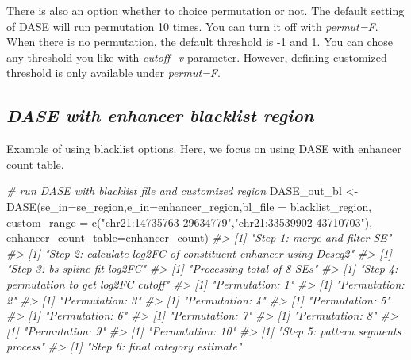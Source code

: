 \documentclass[
]{article}
\newenvironment{Shaded}{\begin{snugshade}}{\end{snugshade}}
\newcommand{\AttributeTok}[1]{\textcolor[rgb]{0.77,0.63,0.00}{#1}}
\newcommand{\CommentTok}[1]{\textcolor[rgb]{0.56,0.35,0.01}{\textit{#1}}}
\newcommand{\FunctionTok}[1]{\textcolor[rgb]{0.00,0.00,0.00}{#1}}
\newcommand{\NormalTok}[1]{#1}
\newcommand{\OtherTok}[1]{\textcolor[rgb]{0.56,0.35,0.01}{#1}}
\newcommand{\StringTok}[1]{\textcolor[rgb]{0.31,0.60,0.02}{#1}}
\begin{document}
There is also an option whether to choice permutation or not. The
default setting of DASE will run permutation 10 times. You can turn it
off with \emph{permut=F}. When there is no permutation, the default
threshold is -1 and 1. You can chose any threshold you like with
\emph{cutoff\_v} parameter. However, defining customized threshold is
only available under \emph{permut=F}.

\hypertarget{dase-with-enhancer-blacklist-region}{%
\subsection{\texorpdfstring{\emph{DASE with enhancer blacklist
region}}{DASE with enhancer blacklist region}}\label{dase-with-enhancer-blacklist-region}}

Example of using blacklist options. Here, we focus on using DASE with
enhancer count table.

\begin{Shaded}
\begin{Highlighting}[]
\CommentTok{\# run DASE with blacklist file and customized region}
\NormalTok{DASE\_out\_bl }\OtherTok{\textless{}{-}} \FunctionTok{DASE}\NormalTok{(}\AttributeTok{se\_in=}\NormalTok{se\_region,}\AttributeTok{e\_in=}\NormalTok{enhancer\_region,}\AttributeTok{bl\_file =}\NormalTok{ blacklist\_region,}
                 \AttributeTok{custom\_range =} \FunctionTok{c}\NormalTok{(}\StringTok{"chr21:14735763{-}29634779"}\NormalTok{,}\StringTok{"chr21:33539902{-}43710703"}\NormalTok{),}
                 \AttributeTok{enhancer\_count\_table=}\NormalTok{enhancer\_count)}
\CommentTok{\#\textgreater{} [1] "Step 1: merge and filter SE"}
\CommentTok{\#\textgreater{} [1] "Step 2: calculate log2FC of constituent enhancer using Deseq2"}
\CommentTok{\#\textgreater{} [1] "Step 3: bs{-}spline fit log2FC"}
\CommentTok{\#\textgreater{} [1] "Processing total of 8 SEs"}
\CommentTok{\#\textgreater{} [1] "Step 4: permutation to get log2FC cutoff"}
\CommentTok{\#\textgreater{} [1] "Permutation: 1"}
\CommentTok{\#\textgreater{} [1] "Permutation: 2"}
\CommentTok{\#\textgreater{} [1] "Permutation: 3"}
\CommentTok{\#\textgreater{} [1] "Permutation: 4"}
\CommentTok{\#\textgreater{} [1] "Permutation: 5"}
\CommentTok{\#\textgreater{} [1] "Permutation: 6"}
\CommentTok{\#\textgreater{} [1] "Permutation: 7"}
\CommentTok{\#\textgreater{} [1] "Permutation: 8"}
\CommentTok{\#\textgreater{} [1] "Permutation: 9"}
\CommentTok{\#\textgreater{} [1] "Permutation: 10"}
\CommentTok{\#\textgreater{} [1] "Step 5: pattern segments process"}
\CommentTok{\#\textgreater{} [1] "Step 6: final category estimate"}
\end{Highlighting}
\end{Shaded}
\end{document}
